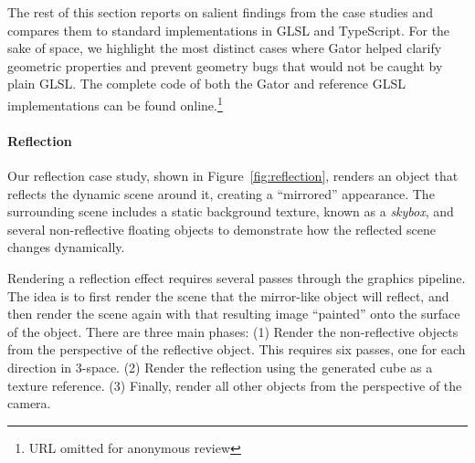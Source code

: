 \documentclass[../main.tex]{subfiles}
\begin{document}
{The rest of this section reports on salient findings from the case studies and compares them to standard implementations in GLSL and TypeScript.
For the sake of space, we highlight the most distinct cases where Gator helped clarify geometric properties and prevent geometry bugs that would not be caught by plain GLSL.  The complete code of both the Gator and reference GLSL implementations can be found online.\footnote{URL omitted for anonymous review}

\paragraph{Reflection}

Our reflection case study, shown in Figure~\ref{fig:reflection}, renders an object that reflects the dynamic scene around it, creating a ``mirrored'' appearance.
The surrounding scene includes a static background texture, known as a \emph{skybox}, and several non-reflective floating objects to demonstrate how the reflected scene changes dynamically.

Rendering a reflection effect requires several passes through the graphics pipeline.
The idea is to first render the scene that the mirror-like object will reflect, and then render the scene again with that resulting image ``painted'' onto the surface of the object.
There are three main phases:
(1) Render the non-reflective objects from the perspective of the reflective object.
This requires six passes, one for each direction in 3-space.
(2) Render the reflection using the generated cube as a texture reference.
(3) Finally, render all other objects from the perspective of the camera.

}
\end{document}
